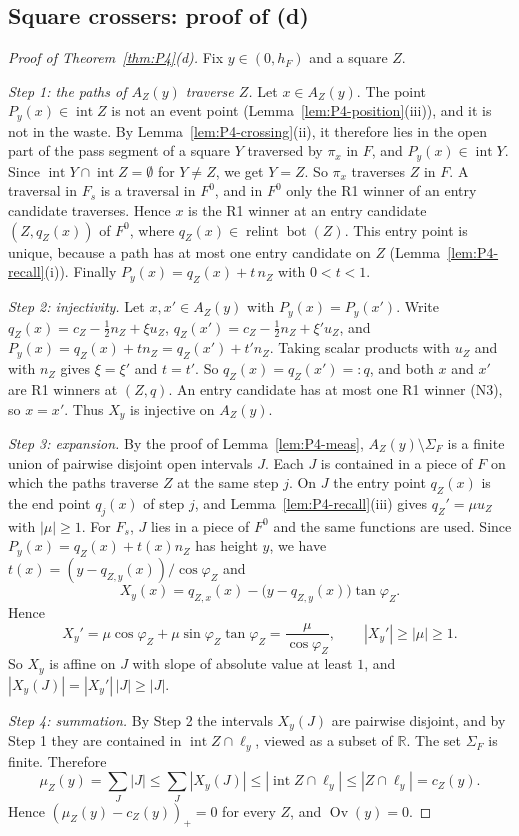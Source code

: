 \documentclass[11pt]{amsart}
\newcommand{\R}{\mathbb R}
\newcommand{\relint}{\operatorname{relint}}
\newcommand{\Bot}{\operatorname{bot}}
\newcommand{\Ov}{\operatorname{Ov}}
\newcommand{\Fz}{F^{0}}
\newcommand{\Fs}{F_{s}}
\theoremstyle{definition}
\theoremstyle{remark}
\numberwithin{equation}{section}
\begin{document}
\subsection{Square crossers: proof of (d)}\label{ssec:P4-d}

\begin{proof}[Proof of Theorem~\ref{thm:P4}(d)]
Fix $y\in(0,h_F)$ and a square $Z$.

\emph{Step 1: the paths of $A_Z(y)$ traverse $Z$.} Let $x\in A_Z(y)$. The point $P_y(x)\in\operatorname{int}Z$ is not an event point (Lemma~\ref{lem:P4-position}(iii)), and it is not in the waste. By Lemma~\ref{lem:P4-crossing}(ii), it therefore lies in the open part of the pass segment of a square $Y$ traversed by $\pi_x$ in $F$, and $P_y(x)\in\operatorname{int}Y$. Since $\operatorname{int}Y\cap\operatorname{int}Z=\emptyset$ for $Y\ne Z$, we get $Y=Z$. So $\pi_x$ traverses $Z$ in $F$. A traversal in $\Fs$ is a traversal in $\Fz$, and in $\Fz$ only the R1 winner of an entry candidate traverses. Hence $x$ is the R1 winner at an entry candidate $(Z,q_Z(x))$ of $\Fz$, where $q_Z(x)\in\relint\Bot(Z)$. This entry point is unique, because a path has at most one entry candidate on $Z$ (Lemma~\ref{lem:P4-recall}(i)). Finally $P_y(x)=q_Z(x)+t\,n_Z$ with $0<t<1$.

\emph{Step 2: injectivity.} Let $x,x'\in A_Z(y)$ with $P_y(x)=P_y(x')$. Write $q_Z(x)=c_Z-\frac12n_Z+\xi u_Z$, $q_Z(x')=c_Z-\frac12n_Z+\xi'u_Z$, and $P_y(x)=q_Z(x)+tn_Z=q_Z(x')+t'n_Z$. Taking scalar products with $u_Z$ and with $n_Z$ gives $\xi=\xi'$ and $t=t'$. So $q_Z(x)=q_Z(x')=:q$, and both $x$ and $x'$ are R1 winners at $(Z,q)$. An entry candidate has at most one R1 winner (N3), so $x=x'$. Thus $X_y$ is injective on $A_Z(y)$.

\emph{Step 3: expansion.} By the proof of Lemma~\ref{lem:P4-meas}, $A_Z(y)\setminus\Sigma_F$ is a finite union of pairwise disjoint open intervals $J$. Each $J$ is contained in a piece of $F$ on which the paths traverse $Z$ at the same step $j$. On $J$ the entry point $q_Z(x)$ is the end point $q_j(x)$ of step $j$, and Lemma~\ref{lem:P4-recall}(iii) gives $q_Z'=\mu u_Z$ with $|\mu|\ge1$. For $\Fs$, $J$ lies in a piece of $\Fz$ and the same functions are used. Since $P_y(x)=q_Z(x)+t(x)n_Z$ has height $y$, we have $t(x)=(y-q_{Z,y}(x))/\cos\varphi_Z$ and
\[
X_y(x)=q_{Z,x}(x)-\big(y-q_{Z,y}(x)\big)\tan\varphi_Z .
\]
Hence
\[
X_y'=\mu\cos\varphi_Z+\mu\sin\varphi_Z\tan\varphi_Z=\frac{\mu}{\cos\varphi_Z},\qquad |X_y'|\ge|\mu|\ge1 .
\]
So $X_y$ is affine on $J$ with slope of absolute value at least $1$, and $|X_y(J)|=|X_y'|\,|J|\ge|J|$.

\emph{Step 4: summation.} By Step 2 the intervals $X_y(J)$ are pairwise disjoint, and by Step 1 they are contained in $\operatorname{int}Z\cap\ell_y$, viewed as a subset of $\R$. The set $\Sigma_F$ is finite. Therefore
\[
\mu_Z(y)=\sum_J|J|\le\sum_J|X_y(J)|\le|\operatorname{int}Z\cap\ell_y|\le|Z\cap\ell_y|=c_Z(y).
\]
Hence $(\mu_Z(y)-c_Z(y))_+=0$ for every $Z$, and $\Ov(y)=0$.
\end{proof}
\end{document}
